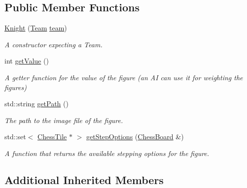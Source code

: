 \subsection*{Public Member Functions}
\begin{DoxyCompactItemize}
\item 
\mbox{\label{classKnight_aee4103f3beddb7aecb291f578c6a64e1}} 
\mbox{\hyperlink{classKnight_aee4103f3beddb7aecb291f578c6a64e1}{Knight}} (\mbox{\hyperlink{classChessFigure_a62f54318c1f28a08e6a6a2707f697a1d}{Team}} \mbox{\hyperlink{classChessFigure_ac7d0751a28c94d49927b9524390d1261}{team}})
\begin{DoxyCompactList}\small\item\em A constructor expecting a Team. \end{DoxyCompactList}\item 
\mbox{\label{classKnight_af0a9bd91ab46869e921b9cbf7a894e44}} 
int \mbox{\hyperlink{classKnight_af0a9bd91ab46869e921b9cbf7a894e44}{get\+Value}} ()
\begin{DoxyCompactList}\small\item\em A getter function for the value of the figure (an AI can use it for weighting the figures) \end{DoxyCompactList}\item 
\mbox{\label{classKnight_a0df5d1725855c2bf6189258ff8f4e675}} 
std\+::string \mbox{\hyperlink{classKnight_a0df5d1725855c2bf6189258ff8f4e675}{get\+Path}} ()
\begin{DoxyCompactList}\small\item\em The path to the image file of the figure. \end{DoxyCompactList}\item 
std\+::set$<$ \mbox{\hyperlink{classChessTile}{Chess\+Tile}} $\ast$ $>$ \mbox{\hyperlink{classKnight_abb638cd75748653ec35365a77d528c42}{get\+Step\+Options}} (\mbox{\hyperlink{classChessBoard}{Chess\+Board}} \&)
\begin{DoxyCompactList}\small\item\em A function that returns the available stepping options for the figure. \end{DoxyCompactList}\end{DoxyCompactItemize}
\subsection*{Additional Inherited Members}


